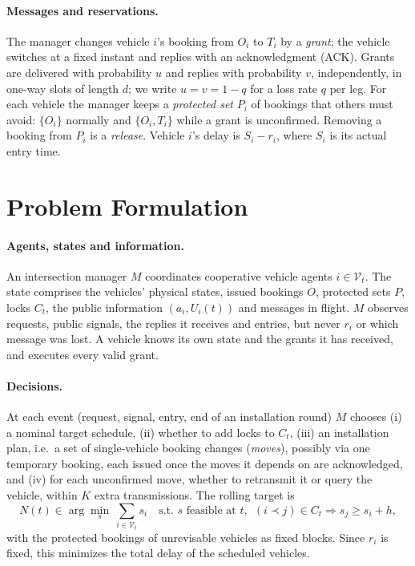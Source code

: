 \documentclass[10pt]{article}
\begin{document}
\paragraph{Messages and reservations.} The manager changes vehicle $i$'s booking from $O_i$ to $T_i$ by a \emph{grant}; the vehicle switches at a fixed instant and replies with an acknowledgment (ACK). Grants are delivered with probability $u$ and replies with probability $v$, independently, in one-way slots of length $d$; we write $u=v=1-q$ for a loss rate $q$ per leg. For each vehicle the manager keeps a \emph{protected set} $P_i$ of bookings that others must avoid: $\{O_i\}$ normally and $\{O_i,T_i\}$ while a grant is unconfirmed. Removing a booking from $P_i$ is a \emph{release}. Vehicle $i$'s delay is $S_i-r_i$, where $S_i$ is its actual entry time.

\section{Problem Formulation}\label{sec:problem}
\paragraph{Agents, states and information.} An intersection manager $M$ coordinates cooperative vehicle agents $i\in\mathcal V_t$. The state comprises the vehicles' physical states, issued bookings $O$, protected sets $P$, locks $C_t$, the public information $(a_i,U_i(t))$ and messages in flight. $M$ observes requests, public signals, the replies it receives and entries, but never $r_i$ or which message was lost. A vehicle knows its own state and the grants it has received, and executes every valid grant.

\paragraph{Decisions.} At each event (request, signal, entry, end of an installation round) $M$ chooses (i) a nominal target schedule, (ii) whether to add locks to $C_t$, (iii) an installation plan, i.e.\ a set of single-vehicle booking changes (\emph{moves}), possibly via one temporary booking, each issued once the moves it depends on are acknowledged, and (iv) for each unconfirmed move, whether to retransmit it or query the vehicle, within $K$ extra transmissions. The rolling target is
\begin{equation}
N(t)\in\arg\min_{s}\ \textstyle\sum_{i\in\mathcal V_t}s_i \quad\text{s.t. } s \text{ feasible at } t,\ \ (i\prec j)\in C_t\Rightarrow s_j\ge s_i+h, \label{eq:target}
\end{equation}
with the protected bookings of unrevisable vehicles as fixed blocks. Since $r_i$ is fixed, this minimizes the total delay of the scheduled vehicles.
\end{document}
